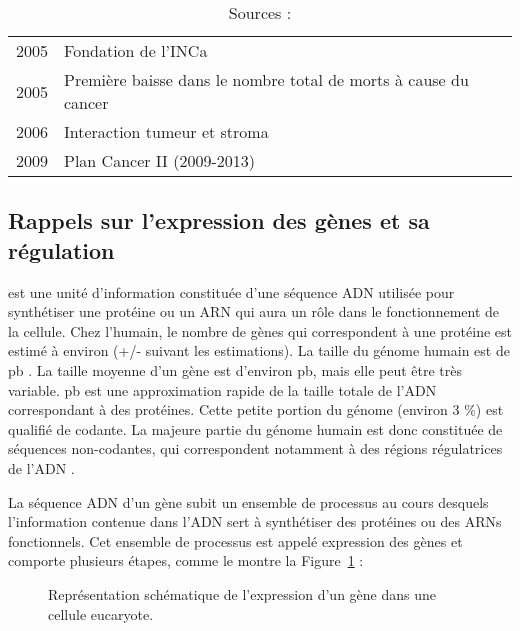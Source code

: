 \begin{table}
\begin{center}
\begin{tabular}{cl}
						2005          & Fondation de l'\ac{INCa}                                                                \\
						2005          & Première baisse dans le nombre total de morts à cause du cancer                         \\
						2006          & Interaction tumeur et stroma                                                            \\
						2009          & Plan Cancer II (2009-2013)                                                              \\
						\bottomrule
					\end{tabular}
					\label{tab:Devita2012}
					\caption*{Sources : \citet{Devita2012}}
				\end{center}
			\end{table}

		\subsection{\textcolor{red!45!black}{Rappels sur l'expression des gènes et sa régulation}}\label{sub:RappelsExpression}
			 est une unité d'information constituée d'une séquence \acs{ADN} utilisée pour synthétiser une protéine ou un \acs{ARN} qui aura un rôle dans le fonctionnement de la cellule.
			Chez l'humain, le nombre de gènes qui correspondent à une protéine est estimé à environ  \citep{HGP2001} (+/-  suivant les estimations).
			La taille du génome humain est de  \ac{pb} \citep{HGP2001}.
			La taille moyenne d'un gène est d'environ  \ac{pb}, mais elle peut être très variable.
			 \ac{pb} est une approximation rapide de la taille totale de l'\acs{ADN} correspondant à des protéines.
			Cette petite portion du génome (environ 3 \%) est qualifié de codante.
			La majeure partie du génome humain est donc constituée de séquences non-codantes, qui correspondent notamment à des régions régulatrices de l'ADN \citep{ENCODE2012}.

			La séquence \acs{ADN} d'un gène subit un ensemble de processus au cours desquels l'information contenue dans l'\acs{ADN} sert à synthétiser des protéines ou des \acsp{ARN} fonctionnels.
			Cet ensemble de processus est appelé expression des gènes et comporte plusieurs étapes, comme le montre la Figure~\ref{fig:Expression} :
			\begin{figure}
				\begin{center}
					\def\svgwidth{.8\columnwidth}
					\caption{Représentation schématique de l'expression d'un gène dans une cellule eucaryote.}
					\label{fig:Expression}
				\end{center}
			\end{figure}


